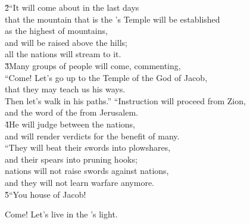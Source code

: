 \begin{poetry}
\poeml \v{2}``It will come about in the last days \\
\poemll    that the mountain that is the 's Temple will be established \\
\poemlll       as the highest of mountains, \\
\poeml and will be raised above the hills; \\
\poemll    all the nations will stream to it. \\
\poeml \v{3}Many groups of people will come, commenting, \\
\poemll    ``Come! Let's go up to the Temple of the God of Jacob, \\
\poeml that they may teach us his ways. \\
\poemll    Then let's walk in his paths.''
\poeml ``Instruction will proceed from Zion, \\
\poemll    and the word of the  from Jerusalem. \\
\poeml \v{4}He will judge between the nations, \\
\poemll    and will render verdicts for the benefit of many. \\
\poeml ``They will beat their swords into plowshares, \\
\poemll    and their spears into pruning hooks; \\
\poeml nations will not raise swords against nations, \\
\poemll    and they will not learn warfare anymore. \\
\poeml \v{5}``You house of Jacob!
\end{poetry}

Come! Let's live in the 's light.

